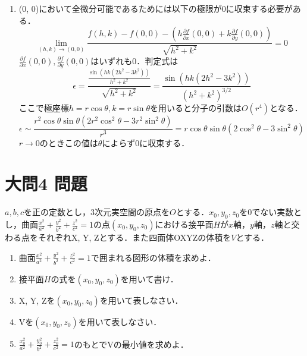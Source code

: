 \documentclass[dvipdfmx]{jsreport}
\begin{document}
\begin{souanswer}
\begin{enumerate}
	\item (0, 0)において全微分可能であるためには以下の極限が0に収束する必要がある．
\begin{equation*}
	\lim_{(h, k)\to (0, 0)} \frac{f(h, k)- f(0, 0)- \left(h\frac{\partial f}{\partial x}(0, 0)+ k\frac{\partial f}{\partial y}(0, 0)\right)}{\sqrt{h^2+ k^2}}= 0
\end{equation*}
	$\frac{\partial f}{\partial x}(0, 0), \frac{\partial f}{\partial y}(0, 0)$はいずれも0．判定式は
\begin{equation*}
	\epsilon= \frac{\frac{\sin(hk(2h^2- 3k^2))}{h^2+ k^2}}{\sqrt{h^2+ k^2}}= \frac{\sin{(hk(2h^2- 3k^2))}}{(h^2+ k^2)^{3/2}}
\end{equation*}
	ここで極座標$h= r\cos{\theta}, k= r\sin{\theta}$を用いると分子の引数は$O(r^4)$となる．
\begin{equation*}
	\epsilon\sim \frac{r^2\cos{\theta}\sin{\theta}(2r^2\cos^2{\theta}- 3r^2\sin^2{\theta})}{r^3}= r\cos{\theta}\sin{\theta}(2\cos^2{\theta}- 3\sin^2{\theta})
\end{equation*}
	$r\to 0$のときこの値は$\theta$によらず0に収束する．
\end{enumerate}
\end{souanswer}
\section{大問4 問題}
\begin{tcolorbox} %
	$a, b, c$を正の定数とし，3次元実空間の原点を$O$とする．$x_0, y_0, z_0$を0でない実数とし，曲面$\frac{x^2}{a^2}+ \frac{y^2}{b^2}+ \frac{z^2}{c^2}= 1$の点$(x_0, y_0, z_0)$における接平面$H$が$x$軸，$y$軸，$z$軸と交わる点をそれぞれX, Y, Zとする．また四面体OXYZの体積を$V$とする．
\begin{enumerate}
	\item 曲面$\frac{x^2}{a^2}+ \frac{y^2}{b^2}+ \frac{z^2}{c^2}= 1$で囲まれる図形の体積を求めよ．
	\item 接平面$H$の式を$(x_0, y_0, z_0)$を用いて書け．
	\item X, Y, Zを$(x_0, y_0, z_0)$を用いて表しなさい．
	\item Vを$(x_0, y_0, z_0)$を用いて表しなさい．
	\item $\frac{x_0^2}{a^2}+ \frac{y_0^2}{b^2}+ \frac{z_0^2}{c^2}= 1$のもとでVの最小値を求めよ．
\end{enumerate}
\end{tcolorbox}
\end{document}
